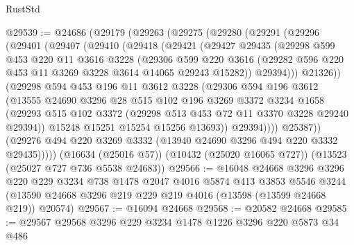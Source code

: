 \begin{lexlean}{RustStd}
\begin{coremodule}
@29539 := @24686
    (@29179
      (@29263
        (@29275
          (@29280
            (@29291
              (@29296
                (@29401
                  (@29407
                    (@29410
                      (@29418
                        (@29421
                          (@29427
                            @29435
                            (@29298
                              @599
                              @453
                              @220
                              @11
                              @3616
                              @3228
                              (@29306
                                @599
                                @220
                                @3616
                                (@29282 @596 @220 @453 @11 @3269 @3228 @3614 @14065 @29243 @15282))
                              @29394)))
                        @21326))
                    (@29298
                      @594
                      @453
                      @196
                      @11
                      @3612
                      @3228
                      (@29306
                        @594
                        @196
                        @3612
                        (@13555
                          @24690
                          @3296
                          @28
                          @515
                          @102
                          @196
                          @3269
                          @3372
                          @3234
                          @1658
                          (@29293
                            @515
                            @102
                            @3372
                            (@29298 @513 @453 @72 @11 @3370 @3228 @29240 @29394))
                          @15248
                          @15251
                          @15254
                          @15256
                          @13693))
                      @29394))))
              @25387))
          (@29276 @494 @220 @3269 @3332 (@13940 @24690 @3296 @494 @220 @3332 @29435)))))
    (@16634 (@25016 @57))
    (@10432 (@25020 @16065 @727))
    (@13523 (@25027 @727 @736 @5538 @24683))
@29566 := @16048
    @24668
    @3296
    @3296
    @220
    @229
    @3234
    @738
    @1478
    @2047
    @4016
    @5874
    @413
    @3853
    @5546
    @3244
    (@13590 @24668 @3296 @219 @229 @219 @4016 (@13598 (@13599 @24668 @219)) @20574)
@29567 := @16094 @24668
@29568 := @20582 @24668
@29585 := @29567
    @29568
    @3296
    @229
    @3234
    @1478
    @1226
    @3296
    @220
    @5873
    @34
    @486

\end{coremodule}
\end{lexlean}
